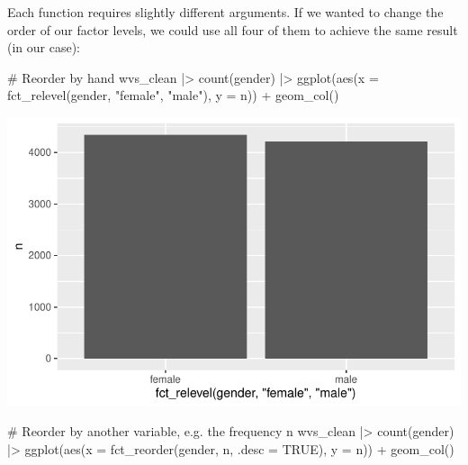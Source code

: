 \documentclass[
  letterpaper,
]{krantz}
\makeatletter
\newenvironment{Shaded}{\begin{snugshade}}{\end{snugshade}}
\newcommand{\AttributeTok}[1]{\textcolor[rgb]{0.40,0.45,0.13}{#1}}
\newcommand{\CommentTok}[1]{\textcolor[rgb]{0.37,0.37,0.37}{#1}}
\newcommand{\ConstantTok}[1]{\textcolor[rgb]{0.56,0.35,0.01}{#1}}
\newcommand{\FunctionTok}[1]{\textcolor[rgb]{0.28,0.35,0.67}{#1}}
\newcommand{\NormalTok}[1]{\textcolor[rgb]{0.00,0.23,0.31}{#1}}
\newcommand{\SpecialCharTok}[1]{\textcolor[rgb]{0.37,0.37,0.37}{#1}}
\newcommand{\StringTok}[1]{\textcolor[rgb]{0.13,0.47,0.30}{#1}}
\newenvironment{kframe}{%
\medskip{}
\setlength{\fboxsep}{.8em}
 \def\at@end@of@kframe{}%
 \ifinner\ifhmode%
  \def\at@end@of@kframe{\end{minipage}}%
  \begin{minipage}{\columnwidth}%
 \fi\fi%
 \def\FrameCommand##1{\hskip\@totalleftmargin \hskip-\fboxsep
 \colorbox{shadecolor}{##1}\hskip-\fboxsep
     \hskip-\linewidth \hskip-\@totalleftmargin \hskip\columnwidth}%
 \MakeFramed {\advance\hsize-\width
   \@totalleftmargin\z@ \linewidth\hsize
   \@setminipage}}%
 {\par\unskip\endMakeFramed%
 \at@end@of@kframe}
\renewenvironment{Shaded}{\begin{kframe}}{\end{kframe}}
\makeatother
\begin{document}
Each function requires slightly different arguments. If we wanted to
change the order of our factor levels, we could use all four of them to
achieve the same result (in our case):

\begin{Shaded}
\begin{Highlighting}[]
\CommentTok{\# Reorder by hand}
\NormalTok{wvs\_clean }\SpecialCharTok{|\textgreater{}}
  \FunctionTok{count}\NormalTok{(gender) }\SpecialCharTok{|\textgreater{}}
  \FunctionTok{ggplot}\NormalTok{(}\FunctionTok{aes}\NormalTok{(}\AttributeTok{x =} \FunctionTok{fct\_relevel}\NormalTok{(gender, }\StringTok{"female"}\NormalTok{, }\StringTok{"male"}\NormalTok{),}
             \AttributeTok{y =}\NormalTok{ n)) }\SpecialCharTok{+}
  \FunctionTok{geom\_col}\NormalTok{()}
\end{Highlighting}
\end{Shaded}

\includegraphics{07_data_wrangling_files/figure-pdf/reorder-factor-levels-forcats-1.pdf}

\begin{Shaded}
\begin{Highlighting}[]
\CommentTok{\# Reorder by another variable, e.g. the frequency \textquotesingle{}n\textquotesingle{}}
\NormalTok{wvs\_clean }\SpecialCharTok{|\textgreater{}}
  \FunctionTok{count}\NormalTok{(gender) }\SpecialCharTok{|\textgreater{}}
  \FunctionTok{ggplot}\NormalTok{(}\FunctionTok{aes}\NormalTok{(}\AttributeTok{x =} \FunctionTok{fct\_reorder}\NormalTok{(gender, n, }\AttributeTok{.desc =} \ConstantTok{TRUE}\NormalTok{),}
             \AttributeTok{y =}\NormalTok{ n)) }\SpecialCharTok{+}
  \FunctionTok{geom\_col}\NormalTok{()}
\end{Highlighting}
\end{Shaded}
\end{document}
